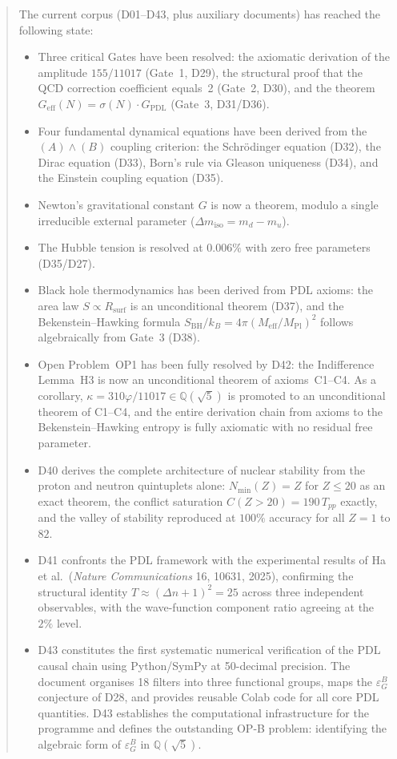 \documentclass[11pt,a4paper]{article}
\theoremstyle{plain}
\theoremstyle{definition}
\theoremstyle{remark}
\newcommand{\Geff}{G_{\mathrm{eff}}}
\newcommand{\GPDL}{G_{\mathrm{PDL}}}
\newcommand{\Rsurf}{R_{\mathrm{surf}}}
\newcommand{\sigmaN}{\sigma(N)}
\newcommand{\SBH}{S_{\mathrm{BH}}}
\newcommand{\Meff}{M_{\mathrm{eff}}}
\newcommand{\MPl}{M_{\mathrm{Pl}}}
\newcommand{\Tpp}{T_{pp}}
\newcommand{\Nmin}{N_{\min}}
\newcommand{\epsGeomB}{\varepsilon_G^B}
\begin{document}
\begin{abstract}
The current corpus (D01--D43, plus auxiliary documents) has reached the following state:
\begin{itemize}
\item Three critical Gates have been resolved: the axiomatic derivation of the amplitude $155/11017$ (Gate~1, D29), the structural proof that the QCD correction coefficient equals~2 (Gate~2, D30), and the theorem $\Geff(N)=\sigmaN\cdot\GPDL$ (Gate~3, D31/D36).
\item Four fundamental dynamical equations have been derived from the $(A)\wedge(B)$ coupling criterion: the Schr\"odinger equation (D32), the Dirac equation (D33), Born's rule via Gleason uniqueness (D34), and the Einstein coupling equation (D35).
\item Newton's gravitational constant $G$ is now a theorem, modulo a single irreducible external parameter ($\Delta m_{\mathrm{iso}} = m_d - m_u$).
\item The Hubble tension is resolved at $0.006\%$ with zero free parameters (D35/D27).
\item Black hole thermodynamics has been derived from PDL axioms: the area law $S \propto \Rsurf$ is an unconditional theorem (D37), and the Bekenstein--Hawking formula $\SBH/k_B = 4\pi(\Meff/\MPl)^2$ follows algebraically from Gate~3 (D38).
\item Open Problem~OP1 has been fully resolved by D42: the Indifference Lemma~H3 is now an unconditional theorem of axioms~C1--C4. As a corollary, $\kappa = 310\varphi/11017 \in \mathbb{Q}(\sqrt{5})$ is promoted to an unconditional theorem of C1--C4, and the entire derivation chain from axioms to the Bekenstein--Hawking entropy is fully axiomatic with no residual free parameter.
\item D40 derives the complete architecture of nuclear stability from the proton and neutron quintuplets alone: $\Nmin(Z) = Z$ for $Z \leq 20$ as an exact theorem, the conflict saturation $C(Z>20) = 190\,\Tpp$ exactly, and the valley of stability reproduced at $100\%$ accuracy for all $Z=1$ to $82$.
\item D41 confronts the PDL framework with the experimental results of Ha et al.\ (\textit{Nature Communications} 16, 10631, 2025), confirming the structural identity $T \approx (\Delta n+1)^2 = 25$ across three independent observables, with the wave-function component ratio agreeing at the $2\%$ level.
\item D43 constitutes the first systematic numerical verification of the PDL causal chain using Python/SymPy at 50-decimal precision. The document organises 18 filters into three functional groups, maps the $\epsGeomB$ conjecture of D28, and provides reusable Colab code for all core PDL quantities. D43 establishes the computational infrastructure for the programme and defines the outstanding OP-B problem: identifying the algebraic form of $\epsGeomB$ in $\mathbb{Q}(\sqrt{5})$.

\end{itemize}
\end{abstract}
\end{document}
